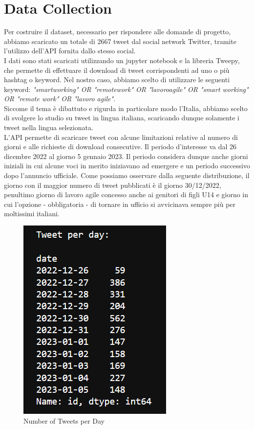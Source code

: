 \documentclass[12pt,journal,compsoc]{IEEEtran}
\begin{document}
\section{Data Collection}
Per costruire il dataset, necessario per rispondere alle domande di progetto, abbiamo scaricato un totale di 2667 tweet dal social network Twitter, tramite l'utilizzo dell'API fornita dallo stesso social.\\
I dati sono stati scaricati utilizzando un jupyter notebook e la libreria Tweepy, che permette di effettuare il download di tweet corrispondenti ad uno o più hashtag o keyword. Nel nostro caso, abbiamo scelto di utilizzare le seguenti keyword: \textit{"smartworking" OR "remotework" OR "lavoroagile" OR "smart working" OR "remote work" OR "lavoro agile"}.\\
Siccome il tema è dibattuto e rigurda in particolare modo l'Italia, abbiamo scelto di svolgere lo studio su tweet in lingua italiana, scaricando dunque solamente i tweet nella lingua selezionata.\\
L'API permette di scaricare tweet con alcune limitazioni relative al numero di giorni e alle richieste di download consecutive. Il periodo d'interesse va dal 26 dicembre 2022 al giorno 5 gennaio 2023. Il periodo considera dunque anche giorni iniziali in cui alcune voci in merito iniziavano ad emergere e un periodo successivo dopo l'annuncio ufficiale. Come possiamo osservare dalla seguente distribuzione, il giorno con il maggior numero di tweet pubblicati è il giorno 30/12/2022, penultimo giorno di lavoro agile concesso anche ai genitori di figli U14 e giorno in cui l'opzione - obbligatoria - di tornare in ufficio si avvicinava sempre più per moltissimi italiani.

\begin{figure}[H]
  \begin{center}
  \includegraphics[scale=1]{./images/tweetxday.png}
  \end{center}
  \caption{Number of Tweets per Day}
\end{figure}
\end{document}
